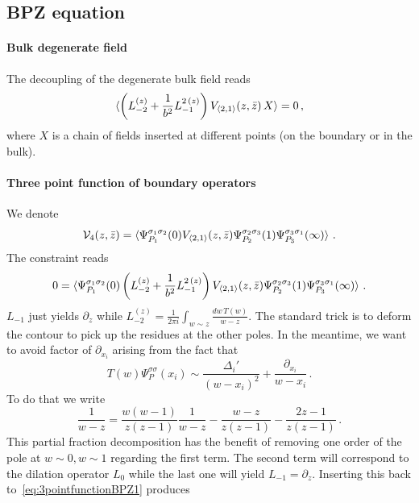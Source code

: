 \documentclass[a4paper]{article}
\begin{document}
\subsection{BPZ equation}
\paragraph{Bulk degenerate field}
The decoupling of the degenerate bulk field reads 
\begin{equation}
  \braket{\left(L_{-2}^{(z)}+\frac{1}{b^2}L_{-1}^{2\,(z)}\right)V_{\braket{2,1}}(z,\bar{z})\,X} = 0\,,
\end{equation}
where $X$ is a chain of fields inserted at different points (on the boundary or in the bulk).
\paragraph{Three point function of boundary operators}
We denote
\begin{equation}
  \mathcal{V}_{4}(z,\bar{z})=\braket{\Psi_{P_1}^{\sigma_1 \sigma_2}(0)V_{\braket{2,1}}(z,\bar{z})\Psi_{P_2}^{\sigma_2 \sigma_3}(1)\Psi_{P_3}^{\sigma_3 \sigma_1}(\infty)}\,.
\end{equation}
The constraint reads
\begin{equation}\label{eq:3pointfunctionBPZ1}
  0=\braket{\Psi_{P_1}^{\sigma_1 \sigma_2}(0)\left(L_{-2}^{(z)}+\frac{1}{b^2}L_{-1}^{2\,(z)}\right)V_{\braket{2,1}}(z,\bar{z})\Psi_{P_2}^{\sigma_2 \sigma_3}(1)\Psi_{P_3}^{\sigma_3 \sigma_1}(\infty)}\,.
\end{equation}
$L_{-1}$ just yields $\partial_z$ while $L_{-2}^{(z)}=\frac{1}{2\pi i}\int_{w \sim z}\frac{dw\,T(w)}{w-z}$. The standard trick is to deform the contour to pick up the residues at the other poles. In the meantime, we want to avoid factor of $\partial_{x_i}$ arising from the fact that 
\begin{equation}
  T(w)\Psi_{P}^{\sigma \sigma}(x_i)\sim \frac{\Delta_i'}{(w-x_{i})^2}+\frac{\partial_{x_{i}}}{w-x_{i}}\,.
\end{equation}
To do that we write
\begin{equation}
  \frac{1}{w-z}=\frac{w(w-1)}{z(z-1)}\frac{1}{w-z}-\frac{w-z}{z(z-1)}-\frac{2z-1}{z(z-1)}\,.
\end{equation}
This partial fraction decomposition has the benefit of removing one order of the pole at $w\sim0,w\sim1$ regarding the first term. The second term will correspond to the dilation operator $L_0$ while the last one will yield $L_{-1}=\partial_z$. Inserting this back to~\eqref{eq:3pointfunctionBPZ1} produces
\end{document}
